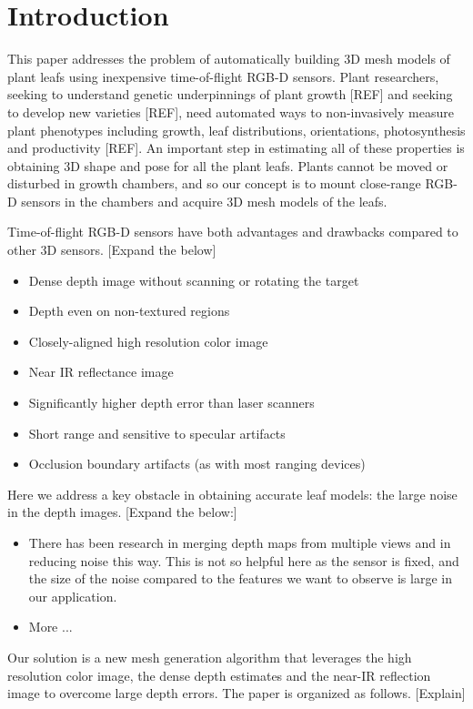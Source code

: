 \section{Introduction}
\label{sec:intro}

This paper addresses the problem of automatically building $3$D mesh models of plant leafs using inexpensive time-of-flight RGB-D sensors.  Plant researchers, seeking to understand genetic underpinnings of plant growth [REF] and seeking to develop new varieties [REF], need automated ways to non-invasively measure plant phenotypes including growth, leaf distributions, orientations, photosynthesis and productivity [REF].  An important step in estimating all of these properties is obtaining $3$D shape and pose for all the plant leafs.  Plants cannot be moved or disturbed in growth chambers, and so our concept is to mount close-range RGB-D sensors in the chambers and acquire 3D mesh models of the leafs.

Time-of-flight RGB-D sensors have both advantages and drawbacks compared to other 3D sensors.  [Expand the below]
\begin{itemize}
\item Dense depth image without scanning or rotating the target
\item Depth even on non-textured regions
\item Closely-aligned high resolution color image
\item Near IR reflectance image
\item Significantly higher depth error than laser scanners
\item Short range and sensitive to specular artifacts
\item Occlusion boundary artifacts (as with most ranging devices)
\end{itemize}

Here we address a key obstacle in obtaining accurate leaf models: the large noise in the depth images. [Expand the below:]
\begin{itemize}
\item There has been research in merging depth maps from multiple views and in reducing noise this way.  This is not so helpful here as the sensor is fixed, and the size of the noise compared to the features we want to observe is large in our application.
\item More ...
\end{itemize}

Our solution is a new mesh generation algorithm that leverages the high resolution color image, the dense depth estimates and the near-IR reflection image to overcome large depth errors.  The paper is organized as follows. [Explain]


